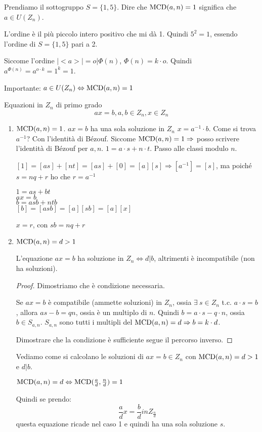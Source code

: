 Prendiamo il sottogruppo $S = \{ 1, 5 \}$. Dire che $\operatorname{MCD}(a, n) = 1$ significa che $a \in U(Z_n)$.

L'ordine \`e il pi\`u piccolo intero positivo che mi d\`a 1. Quindi $5^2 = 1$, essendo l'ordine di $S = \{ 1, 5 \}$ pari a 2.

Siccome l'ordine $|< a >| = o | \Phi(n)$, $\Phi(n) = k \cdot o$. Quindi $a^{\Phi(n)} = a^{o \cdot k} = 1^k = 1$.

Importante: $a \in U(Z_n) \Leftrightarrow \operatorname{MCD}(a, n) = 1$

Equazioni in $Z_n$ di primo grado
\[
ax = b, a, b \in Z_n, x \in Z_n
\]
\begin{enumerate}
    \item $\operatorname{MCD}(a, n) = 1$. $a x = b$ ha una sola soluzione in $Z_n$ $x = a^{-1} \cdot b$. Come si trova $a^{-1}$? Con l'identit\`a di B\'ezouf. Siccome $\operatorname{MCD}(a,n) = 1 \Rightarrow$ posso scrivere l'identit\`a di B\'ezouf per $a, n$. $1 = a \cdot s + n \cdot t$. Passo alle classi modulo $n$.

    $[1] = [as] + [nt] = [as] + [0] = [a] [s] \Rightarrow [a^{-1}] = [s]$, ma poich\'e $s = n q + r$ ho che $r = a^{-1}$

    $1 = as + bt$ \\
    $ax = b$ \\
    $b = asb + ntb$ \\
    $[b] = [asb] = [a] [sb] = [a] [x]$

    $x = r$, con $sb = nq + r$

    \item $\operatorname{MCD}(a, n) = d > 1$

    \begin{prop}
    L'equazione $a x = b$ ha soluzione in $Z_n \Leftrightarrow d | b$, altrimenti \`e incompatibile (non ha soluzioni).
    \end{prop}
    \begin{proof}
    Dimostriamo che \`e condizione necessaria.

    Se $a x = b$ \`e compatibile (ammette soluzioni) in $Z_n$, ossia $\exists \ s \in Z_n$ t.c. $a \cdot s = b$, allora $a s - b = q n$, ossia \`e un multiplo di $n$. Quindi $b = a \cdot s - q \cdot n$, ossia $b \in S_{a, n}$. $S_{a,n}$ sono tutti i multipli del $\operatorname{MCD}(a,n) = d \Rightarrow b = k \cdot d$.

    Dimostrare che la condizione \`e sufficiente segue il percorso inverso.
    \end{proof}
    Vediamo come si calcolano le soluzioni di $ax = b \in Z_n$ con $\operatorname{MCD}(a,n) = d > 1$ e $d | b$.
    \begin{oss}
    $\operatorname{MCD}(a,n) = d \Leftrightarrow \operatorname{MCD}(\frac{a}{d}, \frac{n}{d}) = 1$
    \end{oss}
    Quindi se prendo:
    \[
    \frac{a}{d} x = \frac{b}{d} in Z_{\frac{n}{d}} 
    \]
    questa equazione ricade nel caso 1 e quindi ha una sola soluzione $s$.


\end{enumerate}
